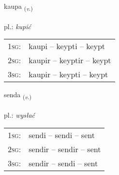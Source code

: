 \documentclass[frontgrid, backgrid]{flacards}\usepackage[]{graphicx}\usepackage[]{xcolor}
\begin{document}
{kaupa \small{\textsubscript{(\textit{v.})}} \\[1ex] %
\textphonetic{[kʰœiːpa]} \\
pl.: \emph{kupić} \\  [2ex]
\renewcommand*{\arraystretch}{0.8}
\begin{tabular}{p{1cm}l}
\textsc{1sg}: & kaupi -- keypti -- keypt \\ 
\textsc{2sg}: & kaupir -- keyptir -- keypt \\ 
\textsc{3sg}: & kaupir -- keypti -- keypt \\ 
\end{tabular}
}

\renewcommand{\flhead}{\vskip5pt \fboxsep=0pt {\small\bfseries\footnotesize Sagnorð | Verb}}
\renewcommand{\fcfoot}{\vskip5pt \fboxsep=0pt \hspace{2pt}{\small\bfseries\footnotesize 1K}}

\renewcommand{\blhead}{\vskip5pt {\small\bfseries\footnotesize Sagnorð | Verb }}
\renewcommand{\bcfoot}{\vskip5pt \hspace{2pt}{\small\bfseries\footnotesize 1K}}


{senda \small{\textsubscript{(\textit{v.})}} \\[1ex] %
\textphonetic{[sɛnta]} \\
pl.: \emph{wysłać} \\  [2ex]
\renewcommand*{\arraystretch}{0.8}
\begin{tabular}{p{1cm}l}
\textsc{1sg}: & sendi -- sendi -- sent \\ 
\textsc{2sg}: & sendir -- sendir -- sent \\ 
\textsc{3sg}: & sendir -- sendi -- sent \\ 
\end{tabular}
}

\renewcommand{\flhead}{\vskip5pt \fboxsep=0pt {\small\bfseries\footnotesize Nafnorð | Verb}}
\renewcommand{\fcfoot}{\vskip5pt \fboxsep=0pt \hspace{2pt}{\small\bfseries\footnotesize 1K}}
\end{document}
